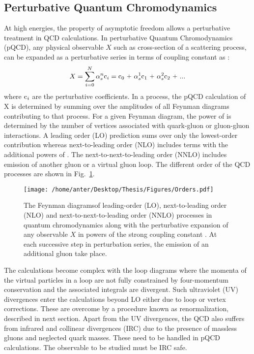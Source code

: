 \subsection{Perturbative Quantum Chromodynamics}
At high energies, the property of asymptotic freedom allows a perturbative treatment in QCD calculations. In perturbative Quantum Chromodynamics (pQCD), any physical observable $X$ such as cross-section of a scattering process, can be expanded as a perturbative series in terms of coupling constant \alps as : 
\begin{equation}
X = \sum\limits_{i=0}^{N} \alpha^n_s {\rm c}_i = {\rm c}_0~\plus \alpha^1_s {\rm c}_1~\plus \alpha^2_s {\rm c}_2~\plus ...
\end{equation} 
where ${\rm c}_i$ are the perturbative coefficients. In a process, the pQCD calculation of X is determined by summing over the amplitudes of all Feynman diagrams contributing to that process. For a given Feynman diagram, the power of \alps is determined by the number of vertices associated with quark-gluon or gluon-gluon interactions. A leading order (LO) prediction sums over only the lowest-order contribution whereas next-to-leading order (NLO) includes terms with the additional powers of \alps. The next-to-next-to-leading order (NNLO) includes emission of another gluon or a virtual gluon loop. The different order of the QCD processes are shown in Fig.~\ref{fig:orders}.
\begin{figure}[!h]
\begin{center}
\hspace*{-1mm}
\texttt{[image: /home/anter/Desktop/Thesis/Figures/Orders.pdf]}\\
\vspace*{4mm}
\caption[The Feynman diagrams of leading-order (LO), next-to-leading order (NLO) and next-to-next-to-leading order (NNLO) processes in quantum chromodynamics.]{The Feynman diagrams\footnotemark of leading-order (LO), next-to-leading order (NLO) and next-to-next-to-leading order (NNLO) processes in quantum chromodynamics along with the perturbative expansion of any observable $X$ in powers of the strong coupling constant \alps. At each successive step in perturbation series, the emission of an additional gluon take place.}
\label{fig:orders}
\end{center}
\end{figure}
The calculations become complex with the loop diagrams where the momenta of the virtual particles in a loop are not fully constrained by four-momentum conservation and the associated integrals are divergent. Such ultraviolet (UV) divergences enter the calculations beyond LO either due to loop or vertex corrections. These are overcome by a procedure known as renormalization, described in next section. Apart from the UV divergences, the QCD also suffers from infrared and collinear divergences (IRC) due to the presence of massless gluons and neglected quark masses. These need to be handled in pQCD calculations. The observable to be studied must be IRC safe. 
